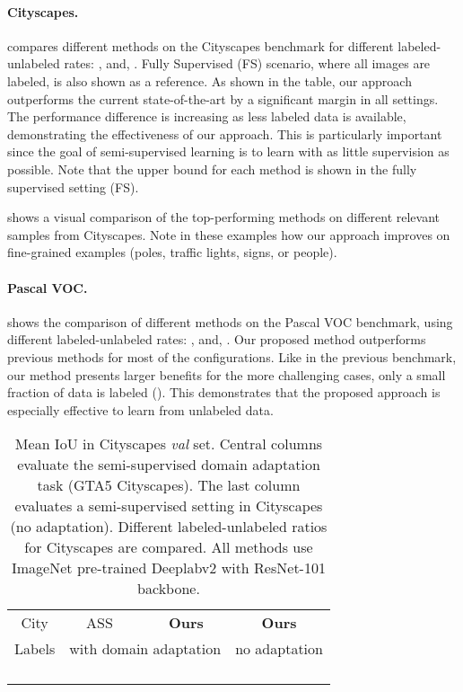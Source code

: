 \documentclass[10pt,twocolumn,letterpaper]{article}
\begin{document}
\paragraph{Cityscapes.}
 compares different methods on the Cityscapes benchmark for different labeled-unlabeled rates: ,  and, . Fully Supervised (FS) scenario, where all images are labeled, is also shown as a reference. 
As shown in the table, our approach outperforms the current state-of-the-art by a significant margin in all settings. The performance difference is increasing as less labeled data is available, demonstrating the effectiveness of our approach. 
This is particularly important since the goal of semi-supervised learning is to learn with as little supervision as possible. Note that the upper bound for each method is shown in the fully supervised setting (FS).  
 
 
 shows a visual comparison of the top-performing methods on different relevant samples from Cityscapes. Note in these examples how our approach improves on fine-grained examples (\eg poles, traffic lights, signs, or people).


\paragraph{Pascal VOC.}
 shows the comparison of different methods on the Pascal VOC benchmark, using different labeled-unlabeled rates: ,  and, . Our proposed method outperforms previous methods for most of the configurations. Like in the previous benchmark, our method presents larger benefits for the more challenging cases, \ie only a small fraction of data is labeled (). This demonstrates that the proposed approach is especially effective to learn from unlabeled data. 


\begin{table}[!b]

\caption{Mean IoU in Cityscapes \textit{val} set. Central columns evaluate the semi-supervised domain adaptation task (GTA5  Cityscapes). The last column evaluates a semi-supervised setting in Cityscapes (no adaptation).
Different labeled-unlabeled ratios for Cityscapes are compared.
All methods use ImageNet pre-trained Deeplabv2 with ResNet-101 backbone.
}
\label{table:domainadaptation}
\centering 
\small
\begin{tabular}{c|cc|c} \toprule
 City & ASS~\cite{wang2020alleviating} & \textbf{Ours}   & \textbf{Ours} \\
 Labels & \multicolumn{2}{c|}{with domain adaptation} &  no adaptation \\

\midrule
 &   &     &          \\ 
&        &   &          \\ 
&    &     &       \\ 
 &     &      &      \\ 
\bottomrule
\end{tabular}

\end{table}
 
\end{document}

